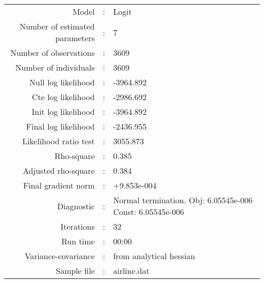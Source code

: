 

\begin{flushleft}
\begin{tabular}{rcl}
\hline
Model &:& Logit\\
Number of estimated parameters&:&7\\
Number of  observations &:& 3609\\
Number of individuals&:&3609\\
Null log likelihood&:&-3964.892\\
Cte log likelihood&:&-2986.692\\
Init log likelihood&:&-3964.892\\
Final log likelihood&:&-2436.955\\
Likelihood ratio test &:&3055.873\\
Rho-square&:&0.385\\
Adjusted rho-square&:&0.384\\
Final gradient norm&:&+9.853e-004\\
Diagnostic&:&Normal termination. Obj: 6.05545e-006 Const: 6.05545e-006\\
Iterations&:&32\\
Run time&:&00:00\\
Variance-covariance&:&from analytical hessian
\\
Sample file&:&airline.dat\\
\end{tabular}
\end{flushleft}
